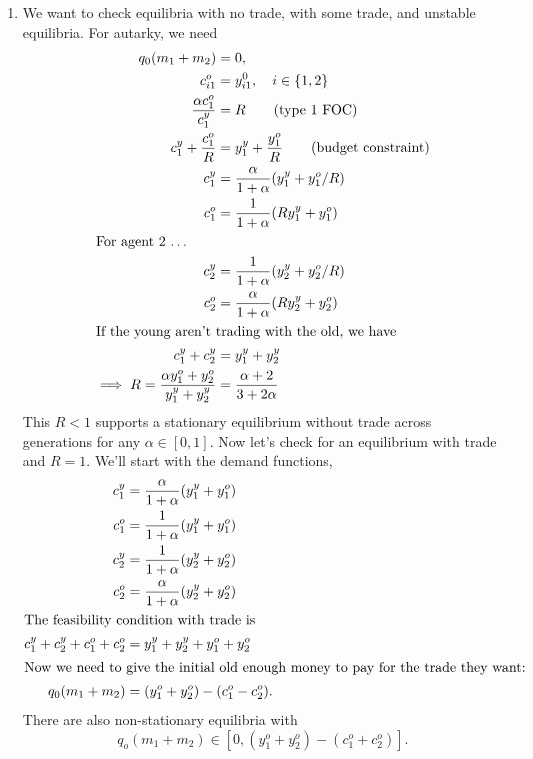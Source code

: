 \documentclass[11pt]{article}
\begin{document}
\begin{enumerate}[label=\alph*)]
\item
We want to check equilibria with no trade, with some trade, and unstable equilibria. For autarky, we need
\begin{align*}
q_0(m_1 + m_2) &= 0,\\
c_{i1}^o &= y_{i1}^0, \quad i \in \{1, 2\}\\
\frac{\alpha c_1^o}{c^y_1} &= R \tag{type 1 FOC}\\
c^y_1 + \frac{c^o_1}{R} &= y^y_1 + \frac{y^o_1}{R}\tag{budget constraint}\\
c_1^y &= \frac{\alpha}{1  + \alpha} (y_1^y + y_1^o/R)\\
c^o_1 &= \frac{1}{1 + \alpha} (Ry^y_1 + y^o_1)\\
\intertext{For agent 2 \ldots }
c_2^y &= \frac{1}{1  + \alpha} (y_2^y + y_2^o/R)\\
c^o_2 &= \frac{\alpha}{1 + \alpha} (Ry^y_2 + y^o_2)\\
\intertext{If the young aren't trading with the old, we have}
c^y_1 + c^y_2 &= y^y_1 + y^y_2\\
\implies R = \frac{\alpha y^o_1 + y^o_2}{y^y_1 + y^y_2} &= \frac{\alpha + 2}{3 + 2 \alpha}
\end{align*}
This \(R < 1\) supports a stationary equilibrium without trade across generations for any \(\alpha \in [0, 1]\). Now let's check for an equilibrium with trade and \(R = 1\). We'll start with the demand functions, 
\begin{align*}
c_1^y &= \frac{\alpha}{1  + \alpha} (y_1^y + y_1^o)\\
c^o_1 &= \frac{1}{1 + \alpha} (y^y_1 + y^o_1)\\
c_2^y &= \frac{1}{1  + \alpha} (y_2^y + y_2^o)\\
c^o_2 &= \frac{\alpha}{1 + \alpha} (y^y_2 + y^o_2)\\
\intertext{The feasibility condition with trade is}
c_1^y + c_2^y +c_1^o + c_2^o &= y_1^y + y_2^y + y_1^o + y_2^o\\
\intertext{Now we need to give the initial old enough money to pay for the trade they want:}
q_0 (m_1 + m_2) &= (y_1^o + y_2^o) - (c_1^o - c_2^o).
\end{align*}
There are also non-stationary equilibria with
\[
q_o (m_1 + m_2) \in [0, (y_1^o + y_2^o) - (c_1^o + c_2^o)].
\]
\end{enumerate}
\end{document}
